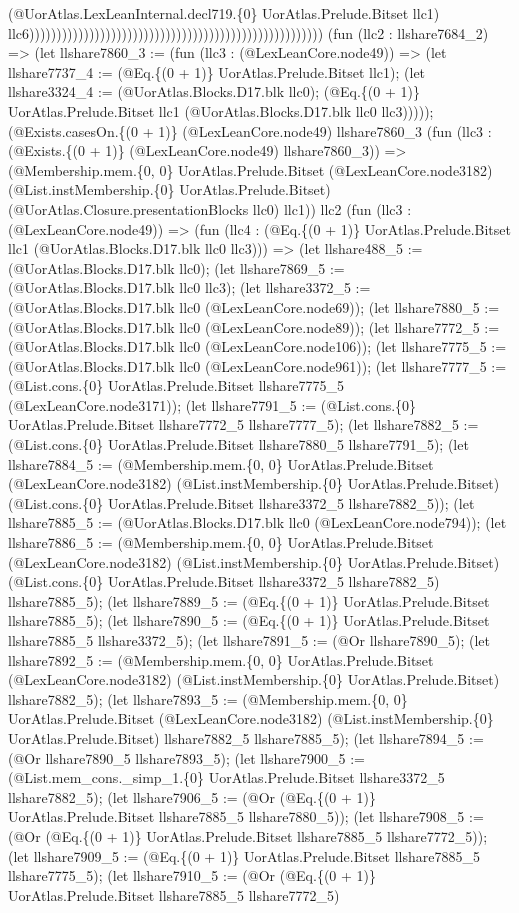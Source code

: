 \documentclass[11pt]{article}
\begin{document}
(@UorAtlas.LexLeanInternal.decl719.\{0\} UorAtlas.Prelude.Bitset llc1) llc6)))))))))))))))))))))))))))))))))))))))))))))))))))))) (fun (llc2 : llshare7684\_2) => (let llshare7860\_3 := (fun (llc3 : (@LexLeanCore.node49)) => (let llshare7737\_4 := (@Eq.\{(0 + 1)\} UorAtlas.Prelude.Bitset llc1); (let llshare3324\_4 := (@UorAtlas.Blocks.D17.blk llc0); (@Eq.\{(0 + 1)\} UorAtlas.Prelude.Bitset llc1 (@UorAtlas.Blocks.D17.blk llc0 llc3))))); (@Exists.casesOn.\{(0 + 1)\} (@LexLeanCore.node49) llshare7860\_3 (fun (llc3 : (@Exists.\{(0 + 1)\} (@LexLeanCore.node49) llshare7860\_3)) => (@Membership.mem.\{0, 0\} UorAtlas.Prelude.Bitset (@LexLeanCore.node3182) (@List.instMembership.\{0\} UorAtlas.Prelude.Bitset) (@UorAtlas.Closure.presentationBlocks llc0) llc1)) llc2 (fun (llc3 : (@LexLeanCore.node49)) => (fun (llc4 : (@Eq.\{(0 + 1)\} UorAtlas.Prelude.Bitset llc1 (@UorAtlas.Blocks.D17.blk llc0 llc3))) => (let llshare488\_5 := (@UorAtlas.Blocks.D17.blk llc0); (let llshare7869\_5 := (@UorAtlas.Blocks.D17.blk llc0 llc3); (let llshare3372\_5 := (@UorAtlas.Blocks.D17.blk llc0 (@LexLeanCore.node69)); (let llshare7880\_5 := (@UorAtlas.Blocks.D17.blk llc0 (@LexLeanCore.node89)); (let llshare7772\_5 := (@UorAtlas.Blocks.D17.blk llc0 (@LexLeanCore.node106)); (let llshare7775\_5 := (@UorAtlas.Blocks.D17.blk llc0 (@LexLeanCore.node961)); (let llshare7777\_5 := (@List.cons.\{0\} UorAtlas.Prelude.Bitset llshare7775\_5 (@LexLeanCore.node3171)); (let llshare7791\_5 := (@List.cons.\{0\} UorAtlas.Prelude.Bitset llshare7772\_5 llshare7777\_5); (let llshare7882\_5 := (@List.cons.\{0\} UorAtlas.Prelude.Bitset llshare7880\_5 llshare7791\_5); (let llshare7884\_5 := (@Membership.mem.\{0, 0\} UorAtlas.Prelude.Bitset (@LexLeanCore.node3182) (@List.instMembership.\{0\} UorAtlas.Prelude.Bitset) (@List.cons.\{0\} UorAtlas.Prelude.Bitset llshare3372\_5 llshare7882\_5)); (let llshare7885\_5 := (@UorAtlas.Blocks.D17.blk llc0 (@LexLeanCore.node794)); (let llshare7886\_5 := (@Membership.mem.\{0, 0\} UorAtlas.Prelude.Bitset (@LexLeanCore.node3182) (@List.instMembership.\{0\} UorAtlas.Prelude.Bitset) (@List.cons.\{0\} UorAtlas.Prelude.Bitset llshare3372\_5 llshare7882\_5) llshare7885\_5); (let llshare7889\_5 := (@Eq.\{(0 + 1)\} UorAtlas.Prelude.Bitset llshare7885\_5); (let llshare7890\_5 := (@Eq.\{(0 + 1)\} UorAtlas.Prelude.Bitset llshare7885\_5 llshare3372\_5); (let llshare7891\_5 := (@Or llshare7890\_5); (let llshare7892\_5 := (@Membership.mem.\{0, 0\} UorAtlas.Prelude.Bitset (@LexLeanCore.node3182) (@List.instMembership.\{0\} UorAtlas.Prelude.Bitset) llshare7882\_5); (let llshare7893\_5 := (@Membership.mem.\{0, 0\} UorAtlas.Prelude.Bitset (@LexLeanCore.node3182) (@List.instMembership.\{0\} UorAtlas.Prelude.Bitset) llshare7882\_5 llshare7885\_5); (let llshare7894\_5 := (@Or llshare7890\_5 llshare7893\_5); (let llshare7900\_5 := (@List.mem\_cons.\_simp\_1.\{0\} UorAtlas.Prelude.Bitset llshare3372\_5 llshare7882\_5); (let llshare7906\_5 := (@Or (@Eq.\{(0 + 1)\} UorAtlas.Prelude.Bitset llshare7885\_5 llshare7880\_5)); (let llshare7908\_5 := (@Or (@Eq.\{(0 + 1)\} UorAtlas.Prelude.Bitset llshare7885\_5 llshare7772\_5)); (let llshare7909\_5 := (@Eq.\{(0 + 1)\} UorAtlas.Prelude.Bitset llshare7885\_5 llshare7775\_5); (let llshare7910\_5 := (@Or (@Eq.\{(0 + 1)\} UorAtlas.Prelude.Bitset llshare7885\_5 llshare7772\_5) 
\end{document}
